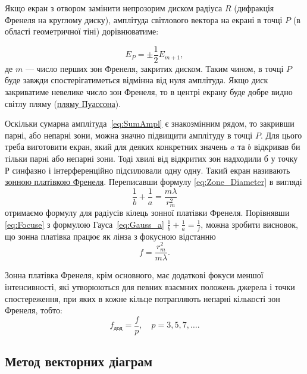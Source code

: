 Якщо екран з отвором замінити непрозорим диском радіуса $R$ (дифракція Френеля на круглому диску), амплітуда світлового вектора на екрані в точці $P$ (в області геометричної тіні) дорівнюватиме:

\begin{equation}\label{eq:Amplitide_of_disk}
    E_P = \pm \frac12 E_{m+1},
\end{equation}
де $ m $ --- число перших зон Френеля, закритих диском.
Таким чином, в точці $P$ буде завжди спостерігатиметься відмінна від нуля амплітуда. Якщо диск закриватиме невелике число зон Френеля, то в центрі екрану буде добре видно світлу пляму (\href{https://www.youtube.com/watch?v=xHHhbR5evq0&ab_channel=InstitutFresnel}{пляму Пуассона}).

Оскільки сумарна амплітуда~\eqref{eq:SumAmpl} є знакозмінним рядом, то закривши парні, або непарні зони, можна значно підвищити амплітуду в точці $P$. Для цього треба виготовити екран, який для деяких конкретних значень $a$ та $b$ відкривав би тільки парні або непарні зони. Тоді хвилі від відкритих зон надходили б у точку $Р$ синфазно і інтерференційно підсилювали одну одну. Такий екран називають \href{https://www.youtube.com/watch?v=aJ4NfUmg16c&ab_channel=mynameismunka2}{зонною платівкою Френеля}. Переписавши формулу \eqref{eq:Zone_Diameter} в вигляді
\begin{equation}\label{eq:Focuse}
    \frac1b+\frac1a=\frac{m\lambda}{r_{m}^{2}}
\end{equation}
отримаємо формулу для радіусів кілець зонної платівки Френеля. Порівнявши \eqref{eq:Focuse} з формулою Гауса~\eqref{eq:Gauss_a} $\frac1b + \frac1a  = \frac1f$, можна зробити висновок, що зонна платівка працює як лінза з фокусною відстанню
\begin{equation}
    f=\frac{r^{2}_{m}}{m\lambda}.
\end{equation}

Зонна платівка Френеля, крім основного, має додаткові фокуси меншої інтенсивності, які утворюються для певних взаємних положень джерела і точки спостереження, при яких в кожне кільце потрапляють непарні кількості зон Френеля, тобто:
\begin{equation*}
    f_\text{дод} = \frac{f}{p}, \quad p = 3, 5, 7,\ldots.
\end{equation*}

\subsection*{Метод векторних діаграм}


